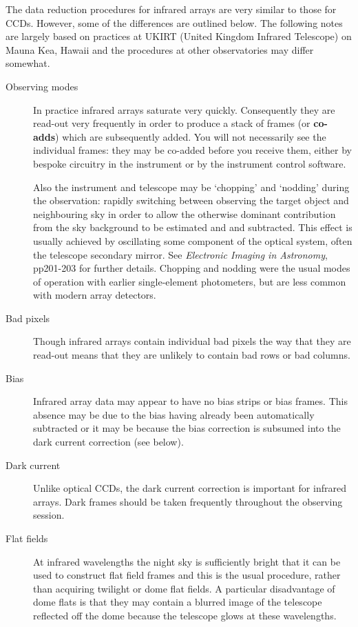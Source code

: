 \documentclass[twoside,11pt]{article}
\begin{document}
The data reduction procedures for infrared arrays are very similar to
those for CCDs.  However, some of the differences are outlined below.
The following notes are largely based on practices at UKIRT (United
Kingdom Infrared Telescope) on Mauna Kea, Hawaii and the procedures
at other observatories may differ somewhat.

\begin{description}

  \item[Observing modes] In practice infrared arrays saturate very
   quickly.  Consequently they are read-out very frequently in order to
   produce a stack of frames (or {\bf co-adds}) which are subsequently
   added.  You will not necessarily see the individual frames: they
   may be co-added before you receive them, either by bespoke circuitry
   in the instrument or by the instrument control software.

   Also the instrument and telescope may be `chopping' and `nodding'
   during the observation: rapidly switching between observing the
   target object and neighbouring sky in order to allow the otherwise
   dominant contribution from the sky background to be estimated and
   and subtracted.  This effect is usually achieved by oscillating some
   component of the optical system, often the telescope secondary mirror.
   See {\it Electronic Imaging in Astronomy}\/\cite{MCLEAN97}, pp201-203
   for further details.  Chopping and nodding were the usual modes of
   operation with earlier single-element photometers, but are less common
   with modern array detectors.

  \item[Bad pixels] Though infrared arrays contain individual bad pixels
   the way that they are read-out means that they are unlikely to contain
   bad rows or bad columns.

  \item[Bias] Infrared array data may appear to have no bias strips or bias
   frames.  This absence may be due to the bias having already been
   automatically subtracted or it may be because the bias correction is
   subsumed into the dark current correction (see below).

  \item[Dark current] Unlike optical CCDs, the dark current correction
   is important for infrared arrays.  Dark frames should be taken
   frequently throughout the observing session.

  \item[Flat fields] At infrared wavelengths the night sky is sufficiently
   bright that it can be used to construct flat field frames and this is
   the usual procedure, rather than acquiring twilight or dome flat fields.
   A particular disadvantage of dome flats is that they may contain a
   blurred image of the telescope reflected off the dome because the
   telescope glows at these wavelengths.


\end{description}
\end{document}
